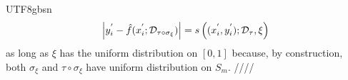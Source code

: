 \documentclass[../../main.tex]{subfiles}
\begin{document}
\begin{CJK*}{UTF8}{gbsn}
\begin{equation*}
    \abs{y_i^{'} - \hat{f}(x_i^{'}; \mathcal{D}_{\tau \circ \sigma_{\xi}})}
    = s\left ( (x_i^{'}, y_i^{'}); \mathcal{D}_{\tau}, \xi \right )
\end{equation*}
as long as $\xi$ has the uniform distribution on $[0,1]$
because, by construction, both $\sigma_{\xi}$ and $\tau \circ \sigma_{\xi}$
have uniform distribution on $S_m$.
////

\end{CJK*}
\end{document}
